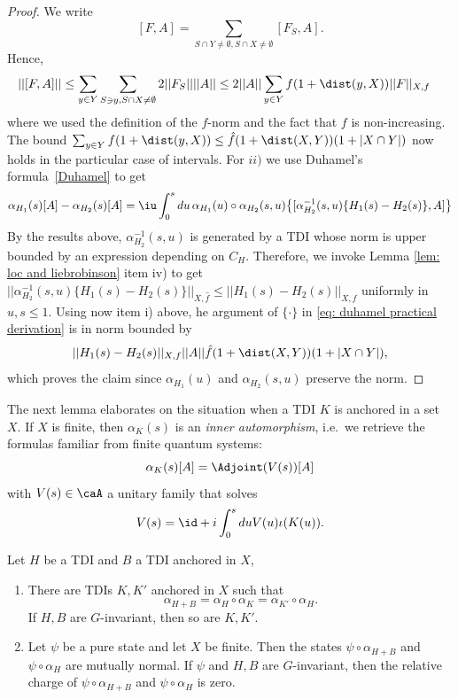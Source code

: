\begin{proof}
	We write
	$$
	[F,A]=\sum_{S \cap Y \neq \emptyset, S \cap X \neq \emptyset }  [F_S,A].
	$$
	Hence,
	\begin{align*}
		||[F,A]|| &\leq \sum_{y\in Y}\sum_{S \ni y, S \cap X \neq \emptyset } 2 ||F_S|| ||A|| 
		\leq  2 ||A|| \sum_{y\in Y}  f(1+\dist(y,X)) ||F||_{X,f} 
	\end{align*}
	where we used the definition of the $f$-norm and the fact that $f$ is non-increasing. The bound $\sum_{y\in Y}  f(1+\dist(y,X))\leq\hat{f}(1+\dist(X,Y)) (1+|X\cap Y|)$ now holds in the particular case of intervals. 
	For $ii)$ we use Duhamel's formula~\eqref{Duhamel} to get
	\begin{equation}
		\alpha_{H_1}(s)[A]-\alpha_{H_2}(s) [A] 
		= \iu\int_0^s du \,   \alpha_{H_1}(u) \circ \alpha_{H_2}(s,u)  \big\{[ \alpha^{-1}_{H_2}(s,u)\{H_1(s)-H_2(s)\}, A]\big\}  \label{eq: duhamel practical derivation}
	\end{equation}
	By the results above, $\alpha^{-1}_{H_2}(s,u)$ is generated by a TDI whose norm is upper bounded by an expression depending on $C_H$. Therefore, we invoke Lemma \ref{lem: loc and liebrobinson} item iv) to get $|| \alpha^{-1}_{H_2}(s,u)\{H_1(s)-H_2(s)\} ||_{X,\hat{f}}\leq   ||H_1(s)-H_2(s) ||_{X,f} $ uniformly in $u,s \leq 1$. 
	Using now item i) above, he argument of $\{\cdot\} $ in \eqref{eq: duhamel practical derivation} is in norm bounded by 
	$$
	||H_1(s)-H_2(s) ||_{X,f}  ||A|| \hat{f}(1+\dist(X,Y)) (1+|X\cap Y|),
	$$
	which proves the claim since $\alpha_{H_1}(u)$ and $ \alpha_{H_2}(s,u)$ preserve the norm.
\end{proof}
The next lemma elaborates on the situation when a TDI $K$ is anchored in a set $X$.   If $X$ is finite, then $\alpha_K(s)$ is an \emph{inner automorphism}, i.e.\ we retrieve the formulas familiar from finite quantum systems:
\begin{equation}\label{eq: finite tdi}
	\alpha_K(s)[A]= \Adjoint(V(s))[A]
\end{equation}
with $V(s) \in \caA$ a unitary family that solves  
$$
V(s)=\id+i\int^s_0 du V(u)\iota(K(u)).
$$
\begin{lemma}\label{lem: local perturbation tdi}
	Let $H$ be a TDI and $B$ a TDI anchored in $X$, 
	\begin{enumerate}
		\item There are TDIs $K,K'$ anchored in $X$ such that 
		$$
		\alpha_{H+B}=\alpha_H \circ  \alpha_K =   \alpha_{K'} \circ  \alpha_H.
		$$
		If $H,B$ are $G$-invariant, then so are $K,K'$.  
		\item  Let $\psi$ be a pure state and let $X$ be finite. Then the states $\psi\circ\alpha_{H+B} $ and $\psi\circ \alpha_H$ are mutually normal. If $\psi$ and $H,B$ are $G$-invariant, then the relative charge of
		$\psi\circ\alpha_{H+B} $ and $\psi\circ \alpha_H$ is zero.
	\end{enumerate}
\end{lemma}
